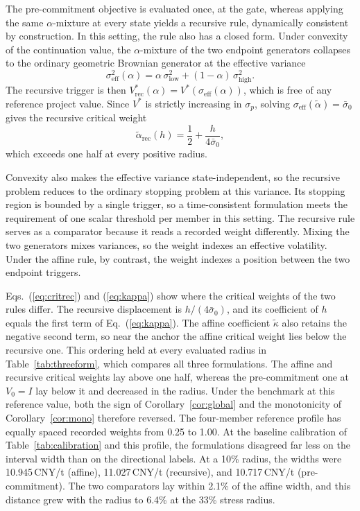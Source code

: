 \documentclass[5p,times,authoryear]{elsarticle}
\theoremstyle{plain}
\newcommand{\sbar}{\bar{\sigma}_0}
\newcommand{\slow}{\sigma_{\mathrm{low}}}
\newcommand{\shigh}{\sigma_{\mathrm{high}}}
\begin{document}
The pre-commitment objective is evaluated once, at the gate, whereas applying the same $\alpha$-mixture at every state yields a recursive rule, dynamically consistent by construction. In this setting, the rule also has a closed form. Under convexity of the continuation value, the $\alpha$-mixture of the two endpoint generators collapses to the ordinary geometric Brownian generator at the effective variance
\begin{equation}
\sigma^{2}_{\mathrm{eff}}(\alpha)=\alpha\,\slow^{2}+(1-\alpha)\,\shigh^{2}.
\label{eq:effvar}
\end{equation}
The recursive trigger is then $V^{*}_{\mathrm{rec}}(\alpha)=V^{*}(\sigma_{\mathrm{eff}}(\alpha))$, which is free of any reference project value. Since $V^{*}$ is strictly increasing in $\sigma_p$, solving $\sigma_{\mathrm{eff}}(\tilde{\alpha})=\sbar$ gives the recursive critical weight
\begin{equation}
\tilde{\alpha}_{\mathrm{rec}}(h)=\frac{1}{2}+\frac{h}{4\sbar},
\label{eq:critrec}
\end{equation}
which exceeds one half at every positive radius.

Convexity also makes the effective variance state-independent, so the recursive problem reduces to the ordinary stopping problem at this variance. Its stopping region is bounded by a single trigger, so a time-consistent formulation meets the requirement of one scalar threshold per member in this setting. The recursive rule serves as a comparator because it reads a recorded weight differently. Mixing the two generators mixes variances, so the weight indexes an effective volatility. Under the affine rule, by contrast, the weight indexes a position between the two endpoint triggers.

Eqs.~(\ref{eq:critrec}) and (\ref{eq:kappa}) show where the critical weights of the two rules differ. The recursive displacement is $h/(4\sbar)$, and its coefficient of $h$ equals the first term of Eq.~(\ref{eq:kappa}). The affine coefficient $\tilde{\kappa}$ also retains the negative second term, so near the anchor the affine critical weight lies below the recursive one. This ordering held at every evaluated radius in Table~\ref{tab:threeform}, which compares all three formulations. The affine and recursive critical weights lay above one half, whereas the pre-commitment one at $V_0=I$ lay below it and decreased in the radius. Under the benchmark at this reference value, both the sign of Corollary~\ref{cor:global} and the monotonicity of Corollary~\ref{cor:mono} therefore reversed. The four-member reference profile has equally spaced recorded weights from 0.25 to 1.00. At the baseline calibration of Table~\ref{tab:calibration} and this profile, the formulations disagreed far less on the interval width than on the directional labels. At a 10\% radius, the widths were 10.945\,CNY/t (affine), 11.027\,CNY/t (recursive), and 10.717\,CNY/t (pre-commitment). The two comparators lay within 2.1\% of the affine width, and this distance grew with the radius to 6.4\% at the 33\% stress radius.
\end{document}
